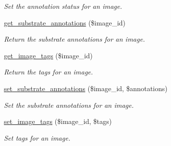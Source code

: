 \begin{DoxyCompactItemize}
\begin{DoxyCompactList}\small\item\em Set the annotation status for an image. \end{DoxyCompactList}\item 
\hyperlink{classDatabase_adf48d605dd4622b07cc9a7f548cc5917}{get\-\_\-substrate\-\_\-annotations} (\$image\-\_\-id)
\begin{DoxyCompactList}\small\item\em Return the substrate annotations for an image. \end{DoxyCompactList}\item 
\hyperlink{classDatabase_a1e9b6dcb97dbec39092dc887db9242b2}{get\-\_\-image\-\_\-tags} (\$image\-\_\-id)
\begin{DoxyCompactList}\small\item\em Return the tags for an image. \end{DoxyCompactList}\item 
\hyperlink{classDatabase_a241720daf5ac8d79ce1283898c0a7da3}{set\-\_\-substrate\-\_\-annotations} (\$image\-\_\-id, \$annotations)
\begin{DoxyCompactList}\small\item\em Set the substrate annotations for an image. \end{DoxyCompactList}\item 
\hyperlink{classDatabase_a19ba63b5a89bb24232cd474c54b4f731}{set\-\_\-image\-\_\-tags} (\$image\-\_\-id, \$tags)
\begin{DoxyCompactList}\small\item\em Set tags for an image. \end{DoxyCompactList}\end{DoxyCompactItemize}
